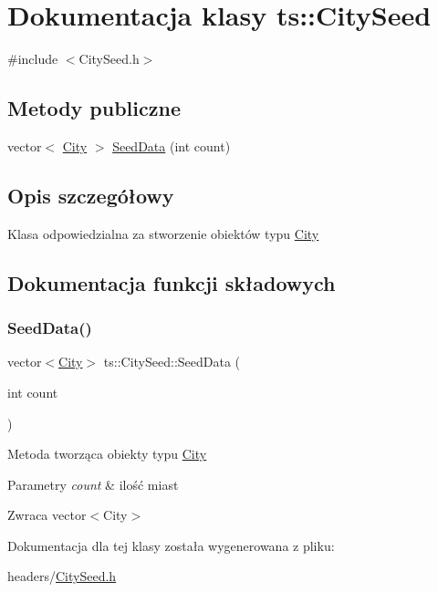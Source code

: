\hypertarget{classts_1_1_city_seed}{}\section{Dokumentacja klasy ts\+:\+:City\+Seed}
\label{classts_1_1_city_seed}


{\ttfamily \#include $<$City\+Seed.\+h$>$}

\subsection*{Metody publiczne}
\begin{DoxyCompactItemize}
\item 
vector$<$ \mbox{\hyperlink{classts_1_1_city}{City}} $>$ \mbox{\hyperlink{classts_1_1_city_seed_a3745be32ad7eae220cbbe5a0a2746aa1}{Seed\+Data}} (int count)
\end{DoxyCompactItemize}


\subsection{Opis szczegółowy}
Klasa odpowiedzialna za stworzenie obiektów typu \mbox{\hyperlink{classts_1_1_city}{City}} 

\subsection{Dokumentacja funkcji składowych}
\mbox{\label{classts_1_1_city_seed_a3745be32ad7eae220cbbe5a0a2746aa1}} 
\subsubsection{\texorpdfstring{Seed\+Data()}{SeedData()}}
{\footnotesize\ttfamily vector$<$\mbox{\hyperlink{classts_1_1_city}{City}}$>$ ts\+::\+City\+Seed\+::\+Seed\+Data (\begin{DoxyParamCaption}\item[{int}]{count }\end{DoxyParamCaption})}

Metoda tworząca obiekty typu \mbox{\hyperlink{classts_1_1_city}{City}}


\begin{DoxyParams}{Parametry}
{\em count} & ilość miast \\
\hline
\end{DoxyParams}
\begin{DoxyReturn}{Zwraca}
vector$<$\+City$>$ 
\end{DoxyReturn}


Dokumentacja dla tej klasy została wygenerowana z pliku\+:\begin{DoxyCompactItemize}
\item 
headers/\mbox{\hyperlink{_city_seed_8h}{City\+Seed.\+h}}\end{DoxyCompactItemize}
